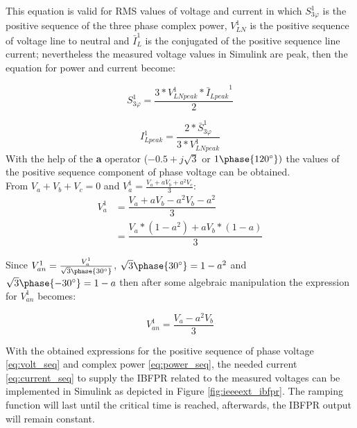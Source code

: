 This equation is valid for RMS values of voltage and current in which $ S_{3\varphi}^1 $ is the positive sequence of the three phase complex power, $ V_{LN}^1 $ is the positive sequence of voltage line to neutral and $ \bar I_{L}^1 $ is the conjugated of the positive sequence line current; nevertheless the measured voltage values in Simulink are peak, then the equation for power and current become:

\begin{equation}
\label{eq:power_seq}
S_{3\varphi}^1=\dfrac{3*V_{LNpeak}^1*{\bar I_{Lpeak}}^1}{2}
\end{equation}




\begin{equation}
\label{eq:current_seq}
I_{Lpeak}^1=\dfrac{2*\bar{S}_{3\varphi}^1}{3*V_{LNpeak}^1}
\end{equation}
With the help of the \textbf{a} operator ($-0.5+j\sqrt{3}$ or $ 1\phase{120^{\circ}}) $ the values of the positive sequence component of phase voltage can be obtained. \\
From $ V_a +V_b+V_c=0$ and $ V_a^1=\frac{V_a+ aV_b+a^2 V_c}{3} $:
\begin{align*}
	 V_a^1 & =\dfrac{V_a+ aV_b-a^2 V_b-a^2}{3} \\
	& =\dfrac{V_a*(1-a^2)+ aV_b*(1-a)}{3}
\end{align*}

Since $V_{an}^1=\frac{V_a^1}{\sqrt{3}\phase{30^{\circ}}}$, $\sqrt{3}\phase{30^{\circ}}=1-a^2 $ and $ \sqrt{3}\phase{-30^{\circ}}=1-a $ then after some algebraic manipulation the expression for $ V_{an}^1 $ becomes:

\begin{equation}
	\label{eq:volt_seq}
	V_{an}^1=\dfrac{V_a-a^2 V_b}{3}
\end{equation}

With the obtained expressions  for the positive sequence of phase voltage \eqref{eq:volt_seq} and complex power \eqref{eq:power_seq}, the needed current \eqref{eq:current_seq} to supply the IBFPR related to the measured voltages can be implemented in Simulink as depicted in Figure \ref{fig:ieeeext_ibfpr}. The ramping function will last until the critical time is reached, afterwards, the IBFPR output will remain constant.

